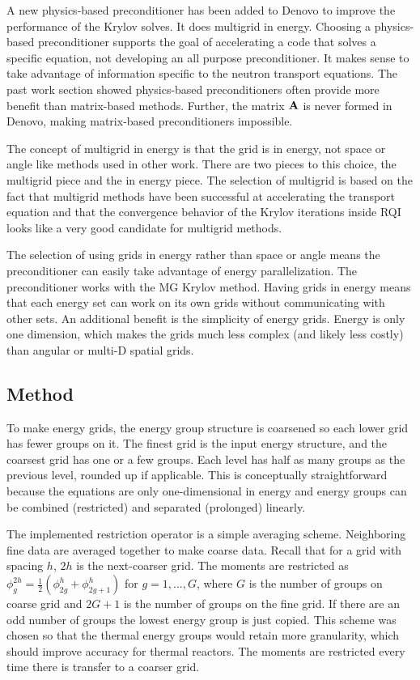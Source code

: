 A new physics-based preconditioner has been added to Denovo to improve the performance of the Krylov solves. It does multigrid in energy. Choosing a physics-based preconditioner supports the goal of accelerating a code that solves a specific equation, not developing an all purpose preconditioner. It makes sense to take advantage of information specific to the neutron transport equations. The past work section showed physics-based preconditioners often provide more benefit than matrix-based methods. Further, the matrix $\mathbf{A}$ is never formed in Denovo, making matrix-based preconditioners impossible. 

The concept of multigrid in energy is that the grid is in energy, not space or angle like methods used in other work. There are two pieces to this choice, the multigrid piece and the in energy piece. The selection of multigrid is based on the fact that multigrid methods have been successful at accelerating the transport equation and that the convergence behavior of the Krylov iterations inside RQI looks like a very good candidate for multigrid methods. 

The selection of using grids in energy rather than space or angle means the preconditioner can easily take advantage of energy parallelization. The preconditioner works with the MG Krylov method. Having grids in energy means that each energy set can work on its own grids without communicating with other sets. An additional benefit is the simplicity of energy grids. Energy is only one dimension, which makes the grids much less complex (and likely less costly) than angular or multi-D spatial grids. 

\subsection{Method}
To make energy grids, the energy group structure is coarsened so each lower grid has fewer groups on it. The finest grid is the input energy structure, and the coarsest grid has one or a few groups. Each level has half as many groups as the previous level, rounded up if applicable. This is conceptually straightforward because the equations are only one-dimensional in energy and energy groups can be combined (restricted) and separated (prolonged) linearly. 

The implemented restriction operator is a simple averaging scheme. Neighboring fine data are averaged together to make coarse data. Recall that for a grid with spacing $h$, $2h$ is the next-coarser grid. The moments are restricted as $\phi_{g}^{2h} = \frac{1}{2}(\phi_{2g}^{h} + \phi_{2g+1}^{h})$ for $g = 1,...,G$, where $G$ is the number of groups on coarse grid and $2G+1$ is the number of groups on the fine grid. If there are an odd number of groups the lowest energy group is just copied. This scheme was chosen so that the thermal energy groups would retain more granularity, which should improve accuracy for thermal reactors. The moments are restricted every time there is transfer to a coarser grid.


